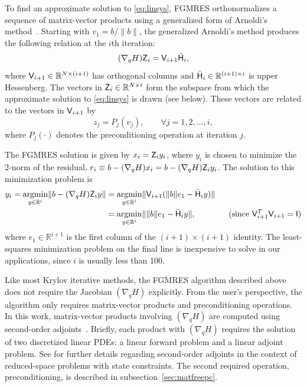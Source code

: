 To find an approximate solution to \eqref{eq:linsys}, FGMRES orthonormalizes a
sequence of matrix-vector products using a generalized form of Arnoldi's
method~\cite{saad:2003}.  Starting with $v_{1} = b/\|b\|$, the generalized
Arnoldi's method produces the following relation at the $i$th iteration:
\begin{equation}\label{eq:arnoldi}
  (\nabla_q H) \mathsf{Z}_{i} = \mathsf{V}_{i+1} \bar{\mathsf{H}}_{i},
\end{equation}
where $\mathsf{V}_{i+1} \in \mathbb{R}^{N\times (i+1)}$ has orthogonal columns and
$\bar{\mathsf{H}}_{i} \in \mathbb{R}^{(i+1)\times i}$ is upper Hessenberg.  The
vectors in $\mathsf{Z}_{i} \in \mathbb{R}^{N\times i}$ form the subspace from which
the approximate solution to \eqref{eq:linsys} is drawn (see below).  These
vectors are related to the vectors in $\mathsf{V}_{i+1}$ by
\begin{equation*}
  z_{j} = P_j(v_{j}), \qquad \forall j = 1,2,\ldots,i,
\end{equation*}
where $P_j(\cdot)$ denotes the preconditioning operation at iteration $j$.    

The FGMRES solution is given by $x_{i} = \mathsf{Z}_{i} y_{i}$, where $y_{i}$ is
chosen to minimize the 2-norm of the residual, $r_i \equiv b -  (\nabla_q H) x_i = b -  (\nabla_q H)\mathsf{Z}_i y_i$. The solution to this minimization problem is 
\begin{align*}
  y_{i} = \underset{y \in \mathbb{R}^i}{\textrm{argmin}}
  \lVert b -  (\nabla_q H) \mathsf{Z}_i y \| 
  &= \underset{y \in \mathbb{R}^i}{\textrm{argmin}}
  \lVert \mathsf{V}_{i+1} (\|b\| e_1 - \bar{\mathsf{H}}_{i} y) \| \\
  &= \underset{y \in \mathbb{R}^i}{\textrm{argmin}}
  \lVert \|b\| e_1 - \bar{\mathsf{H}}_{i} y \|,
  \qquad\qquad\text{(since $\mathsf{V}_{i+1}^T \mathsf{V}_{i+1} = \mathsf{I}$)}
\end{align*}
where $e_{1} \in \mathbb{R}^{i+1}$ is the first column of the $(i+1)\times(i+1)$
identity. The least-squares minimization problem on the final line is inexpensive to solve 
in our applications,  since $i$ is usually less than 100.

Like most Krylov iterative methods, the FGMRES algorithm described above does
not require the Jacobian $(\nabla_q H)$ explicitly.  From the user's
perspective, the algorithm only requires matrix-vector products and
preconditioning operations.  In this work, matrix-vector products involving
$(\nabla_q H)$ are computed using second-order adjoints~\cite{wang:1992,
  hicken:inexact2014}.  Briefly, each product with $(\nabla_q H)$ requires the
solution of two discretized linear PDEs: a linear forward problem and a linear
adjoint problem.  See \cite{dener:scitech2015} for further details regarding
second-order adjoints in the context of reduced-space problems with state
constraints.  The second required operation, preconditioning, is described in
subsection~\ref{sec:matfreepc}.


